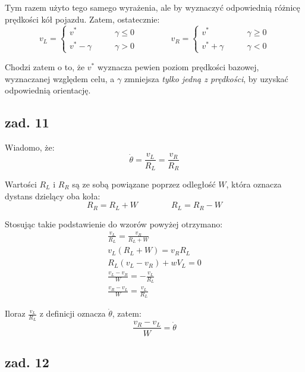 \documentclass[11pt, a4paper]{article}
\begin{document}
Tym razem użyto tego samego wyrażenia, ale by wyznaczyć odpowiednią różnicę prędkości kół pojazdu. Zatem, ostatecznie:
\begin{equation*}
v_L =
	\begin{cases}
	v^{*} &
		\qquad \gamma \le 0 \\
	v^{*} - \gamma &
		\qquad \gamma > 0 
	\end{cases}
\qquad\qquad
v_R =
	\begin{cases}
	v^{*} &
		\qquad \gamma \ge 0 \\
	v^{*} + \gamma &
		\qquad \gamma < 0 
	\end{cases}
\end{equation*}

Chodzi zatem o to, że $v^{*}$ wyznacza pewien poziom prędkości bazowej, wyznaczanej względem celu, a $\gamma$ zmniejsza \emph{tylko jedną z prędkości}, by uzyskać odpowiednią orientację.

\subsection*{zad. 11}

Wiadomo, że:
\begin{equation*}
\dot{\theta} = \frac{v_L}{R_L} = \frac{v_R}{R_R}
\end{equation*}

Wartości $R_L$ i $R_R$ są ze sobą powiązane poprzez odległość $W$, która oznacza dystans dzielący oba koła:
\begin{equation*}
R_R = R_L + W \qquad\qquad R_L = R_R - W
\end{equation*}

Stosując takie podstawienie do wzorów powyżej otrzymano:
\begin{gather*}
\frac{v_L}{R_L} = \frac{v_R}{R_L + W} \\
v_L (R_L + W) = v_R R_L \\ 
R_L (v_L - v_R) + w V_L = 0 \\
\frac{v_L - v_R}{W} = - \frac{v_L}{R_L} \\
\frac{v_R - v_L}{W} = \frac{v_L}{R_L}
\end{gather*}

Iloraz $\frac{v_L}{R_L}$ z definicji oznacza $\dot{\theta}$, zatem:
\begin{equation*}
\frac{v_R - v_L}{W} = \dot{\theta}
\end{equation*}

\subsection*{zad. 12}
\end{document}
